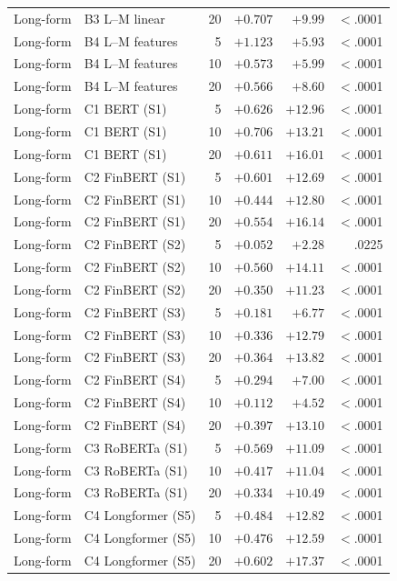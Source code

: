 \begin{table}[p]
\begin{tabular}{@{}llrrrr@{}}
Long-form & B3 L--M linear & 20 & $+0.707$ & $+9.99$ & $<$.0001 \\
\addlinespace
Long-form & B4 L--M features & 5 & $+1.123$ & $+5.93$ & $<$.0001 \\
Long-form & B4 L--M features & 10 & $+0.573$ & $+5.99$ & $<$.0001 \\
Long-form & B4 L--M features & 20 & $+0.566$ & $+8.60$ & $<$.0001 \\
\addlinespace
Long-form & C1 BERT (S1) & 5 & $+0.626$ & $+12.96$ & $<$.0001 \\
Long-form & C1 BERT (S1) & 10 & $+0.706$ & $+13.21$ & $<$.0001 \\
Long-form & C1 BERT (S1) & 20 & $+0.611$ & $+16.01$ & $<$.0001 \\
\addlinespace
Long-form & C2 FinBERT (S1) & 5 & $+0.601$ & $+12.69$ & $<$.0001 \\
Long-form & C2 FinBERT (S1) & 10 & $+0.444$ & $+12.80$ & $<$.0001 \\
Long-form & C2 FinBERT (S1) & 20 & $+0.554$ & $+16.14$ & $<$.0001 \\
\addlinespace
Long-form & C2 FinBERT (S2) & 5 & $+0.052$ & $+2.28$ & .0225 \\
Long-form & C2 FinBERT (S2) & 10 & $+0.560$ & $+14.11$ & $<$.0001 \\
Long-form & C2 FinBERT (S2) & 20 & $+0.350$ & $+11.23$ & $<$.0001 \\
\addlinespace
Long-form & C2 FinBERT (S3) & 5 & $+0.181$ & $+6.77$ & $<$.0001 \\
Long-form & C2 FinBERT (S3) & 10 & $+0.336$ & $+12.79$ & $<$.0001 \\
Long-form & C2 FinBERT (S3) & 20 & $+0.364$ & $+13.82$ & $<$.0001 \\
\addlinespace
Long-form & C2 FinBERT (S4) & 5 & $+0.294$ & $+7.00$ & $<$.0001 \\
Long-form & C2 FinBERT (S4) & 10 & $+0.112$ & $+4.52$ & $<$.0001 \\
Long-form & C2 FinBERT (S4) & 20 & $+0.397$ & $+13.10$ & $<$.0001 \\
\addlinespace
Long-form & C3 RoBERTa (S1) & 5 & $+0.569$ & $+11.09$ & $<$.0001 \\
Long-form & C3 RoBERTa (S1) & 10 & $+0.417$ & $+11.04$ & $<$.0001 \\
Long-form & C3 RoBERTa (S1) & 20 & $+0.334$ & $+10.49$ & $<$.0001 \\
\addlinespace
Long-form & C4 Longformer (S5) & 5 & $+0.484$ & $+12.82$ & $<$.0001 \\
Long-form & C4 Longformer (S5) & 10 & $+0.476$ & $+12.59$ & $<$.0001 \\
Long-form & C4 Longformer (S5) & 20 & $+0.602$ & $+17.37$ & $<$.0001 \\
\bottomrule
\end{tabular}
\end{table}

